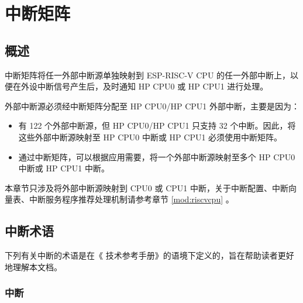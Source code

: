\documentclass[main\_\_CN.tex]{subfiles}
\begin{document}

\ifglobal
\else
    {\let\clearpage\relax \listoftodos}
    {\let\clearpage\relax \listofdonetodos}
    \tableofcontents
\fi



\hypertarget{intmtrx}{}
\chapter{中断矩阵}
\label{mod:intmtrx}

\section{概述}


\chipname{} 中断矩阵将任一外部中断源单独映射到 ESP-RISC-V CPU 的任一外部中断上，以便在外设中断信号产生后，及时通知 HP CPU0 或 HP CPU1 进行处理。

外部中断源必须经中断矩阵分配至 HP CPU0/HP CPU1 外部中断，主要是因为：
\begin{itemize}
    \item \chipname{} 有 122 个外部中断源，但 HP CPU0/HP CPU1 只支持 32 个中断。因此，将这些外部中断源映射至 HP CPU0 中断或 HP CPU1 必须使用中断矩阵。
    \item 通过中断矩阵，可以根据应用需要，将一个外部中断源映射至多个 HP CPU0 中断或 HP CPU1 中断。
\end{itemize}

\begin{tiplisting}
本章节只涉及将外部中断源映射到 CPU0 或 CPU1 中断，关于中断配置、中断向量表、中断服务程序推荐处理机制请参考章节 \ref{mod:riscvcpu} \textit{}。
\end{tiplisting}
\vspace{-1em}

\section{\chipname{} 中断术语}\label{sec:intmtx-int-terminology}

下列有关中断的术语是在《\chipname{} 技术参考手册》的语境下定义的，旨在帮助读者更好地理解本文档。

\subsection{中断}
\end{document}
